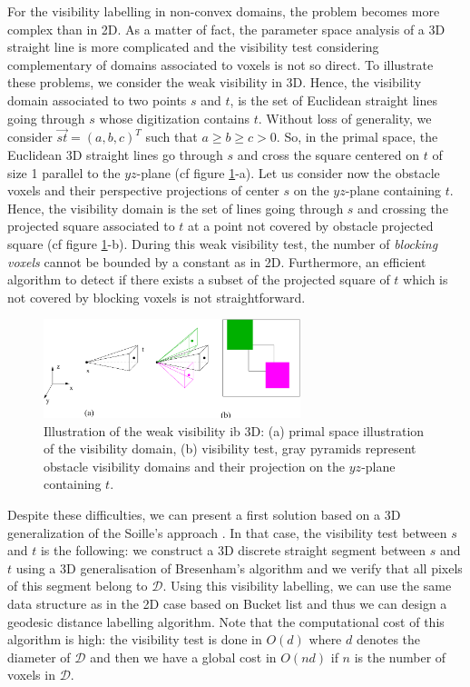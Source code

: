 \documentclass[fleqn,twoside]{article}
\begin{document}
For   the visibility labelling   in   non-convex domains, the  problem
becomes more complex than  in 2D. As  a matter of fact,  the parameter
space analysis of  a 3D  straight line  is  more  complicated and  the
visibility test  considering complementary  of  domains associated  to
voxels  is not so  direct.  To illustrate  these problems, we consider
the weak visibility in 3D.  Hence, the visibility domain associated to
two points $s$ and  $t$, is the  set of Euclidean straight lines going
through $s$ whose  digitization  contains    $t$.  Without loss     of
generality, we consider  $\vec{st}=(a,b,c)^T$  such that $a\geq  b\geq
c>0$.   So, in the primal  space,  the Euclidean  3D straight lines go
through $s$ and cross the square centered on $t$ of size 1 parallel to
the  $yz$-plane (cf figure \ref{cone3D}-a).   Let us  consider now the
obstacle voxels and their perspective projections of center $s$ on the
$yz$-plane containing $t$. Hence, the visibility  domain is the set of
lines going through $s$  and crossing the projected square  associated
to $t$ at a point not covered by  obstacle projected square (cf figure
\ref{cone3D}-b).  During this weak visibility test, the number of {\it
blocking  voxels}   cannot  be   bounded  by a    constant  as in  2D.
Furthermore, an efficient algorithm to detect if there exists a subset
of the projected square of $t$ which is not covered by blocking voxels
is not straightforward.

\begin{figure}[htb]
  \begin{center}
    \includegraphics[width=7.5cm]{cone3D}
   \caption{Illustration of the weak visibility ib 3D: (a) primal space
    illustration of the visibility domain, (b) visibility test, gray
    pyramids represent obstacle visibility domains and their
    projection on the $yz$-plane containing $t$.}
   \label{cone3D}
\end{center}
\end{figure}

Despite these difficulties, we can present a first solution based on a
3D          generalization        of   the        Soille's    approach
\cite{soille91,soille94,soillebook}.  In that  case, the   visibility
test between $s$ and $t$ is the  following: we construct a 3D discrete
straight segment  between $s$  and $t$  using  a 3D  generalisation of
Bresenham's algorithm  \cite{AMA87,3Dnss}  and we   verify that   all
pixels of this segment  belong to $\mathcal{D}$. Using this visibility
labelling, we can use the same data structure as  in the 2D case based
on Bucket list  and thus we can  design a geodesic  distance labelling
algorithm.  Note that  the  computational  cost of this   algorithm is
high: the  visibility  test is  done in $O(d)$   where $d$ denotes the
diameter of $\mathcal{D}$ and then we have a global cost in $O(nd)$ if
$n$ is the number of voxels in $\mathcal{D}$.
\end{document}
